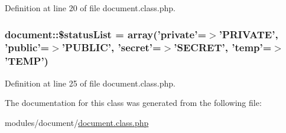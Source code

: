 Definition at line 20 of file document.\-class.\-php.

\hypertarget{classdocument_a93e1c85a4ec17a1471b874fdb14cce58}{
\subsubsection[{\$status\-List}]{\setlength{\rightskip}{0pt plus 5cm}document\-::\$status\-List = array('private'=$>$'P\-R\-I\-V\-A\-T\-E', 'public'=$>$'P\-U\-B\-L\-I\-C', 'secret'=$>$'S\-E\-C\-R\-E\-T', 'temp'=$>$'T\-E\-M\-P')}}\label{classdocument_a93e1c85a4ec17a1471b874fdb14cce58}


Definition at line 25 of file document.\-class.\-php.



The documentation for this class was generated from the following file\-:\begin{DoxyCompactItemize}
\item 
modules/document/\hyperlink{document_8class_8php}{document.\-class.\-php}\end{DoxyCompactItemize}
